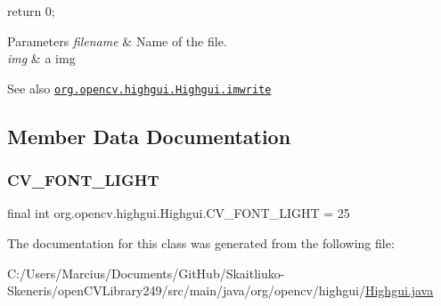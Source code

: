 {\ttfamily }

{\ttfamily return 0;}

{\ttfamily }

{\ttfamily 
\begin{DoxyParams}{Parameters}
{\em filename} & Name of the file. \\
\hline
{\em img} & a img\\
\hline
\end{DoxyParams}
\begin{DoxySeeAlso}{See also}
\href{http://docs.opencv.org/modules/highgui/doc/reading_and_writing_images_and_video.html#imwrite}{\tt org.\+opencv.\+highgui.\+Highgui.\+imwrite} 
\end{DoxySeeAlso}
}

\subsection{Member Data Documentation}
\mbox{\label{classorg_1_1opencv_1_1highgui_1_1_highgui_a7c1682eaa282f2d7f586689734ca723c}} 
\subsubsection{\texorpdfstring{C\+V\+\_\+\+F\+O\+N\+T\+\_\+\+L\+I\+G\+HT}{CV\_FONT\_LIGHT}}
{\footnotesize\ttfamily final int org.\+opencv.\+highgui.\+Highgui.\+C\+V\+\_\+\+F\+O\+N\+T\+\_\+\+L\+I\+G\+HT = 25\hspace{0.3cm}{\ttfamily [static]}}



The documentation for this class was generated from the following file\+:\begin{DoxyCompactItemize}
\item 
C\+:/\+Users/\+Marcius/\+Documents/\+Git\+Hub/\+Skaitliuko-\/\+Skeneris/open\+C\+V\+Library249/src/main/java/org/opencv/highgui/\mbox{\hyperlink{_highgui_8java}{Highgui.\+java}}\end{DoxyCompactItemize}
